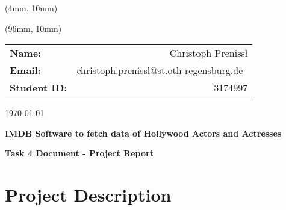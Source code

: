 \documentclass[12pt]{article}
\author{Christoph Prenissl}
\date{\today}
\begin{document}
\begin{titlepage}

      \begin{textblock*}{200mm}(4mm, 10mm)
            \begin{figure}
                  \def\svgscale{0.6}
                  
            \end{figure}
      \end{textblock*}

      \begin{textblock*}{200mm}(96mm, 10mm)
            \begin{tabular}[h]{lr}
                  \textbf{Name:}       & Christoph Prenissl                                                                              \\
                  \textbf{Email:}      & \href{mailto:christoph.prenissl@st.oth-regensburg.de}{christoph.prenissl@st.oth-regensburg.de}\ \\
                  \textbf{Student ID:} & 3174997                                                                                         \\
            \end{tabular}
      \end{textblock*}

      \begin{flushright}
            \today
      \end{flushright}

      \vspace{2cm}

      \begin{center}
            \textbf{\Large{IMDB Software to fetch data of Hollywood Actors and Actresses}}

            \vspace{6cm}

            \textbf{Task 4 Document - Project Report}

            \vspace{10cm}
      \end{center}
\end{titlepage}

\newpage

\tableofcontents

\newpage

\section{Project Description}
\end{document}

